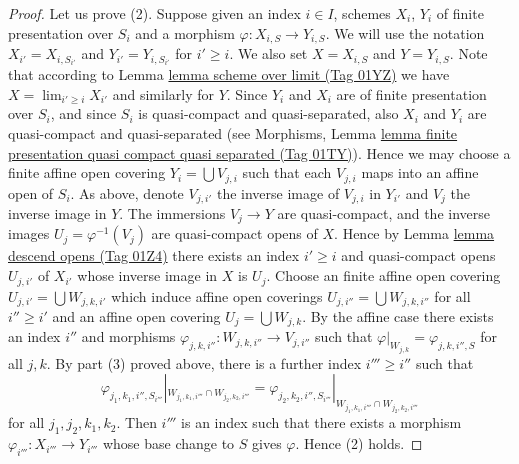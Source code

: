 \documentclass{amsart}
\theoremstyle{plain}
\theoremstyle{definition}
\theoremstyle{remark}
\numberwithin{equation}{subsection}
\def\lim{\mathop{\mathrm{lim}}\nolimits}
\begin{document}
\begin{proof}
\medskip\noindent
Let us prove (2). Suppose given an index $i \in I$, schemes
$X_i$, $Y_i$ of finite presentation over $S_i$ and a morphism
$\varphi : X_{i, S} \to Y_{i, S}$. We will use the notation
$X_{i'} = X_{i, S_{i'}}$ and $Y_{i'} = Y_{i, S_{i'}}$ for
$i' \geq i$. We also set $X = X_{i, S}$ and $Y = Y_{i, S}$.
Note that according to Lemma \href{https://stacks.math.columbia.edu/tag/01YZ}{lemma scheme over limit (Tag 01YZ)} we have
$X = \lim_{i' \geq i} X_{i'}$ and similarly for $Y$.
Since $Y_i$ and $X_i$ are of finite presentation
over $S_i$, and since $S_i$ is quasi-compact and quasi-separated, also
$X_i$ and $Y_i$ are quasi-compact and quasi-separated
(see Morphisms,
Lemma \href{https://stacks.math.columbia.edu/tag/01TY}{lemma finite presentation quasi compact quasi separated (Tag 01TY)}).
Hence we may choose a finite affine open covering
$Y_i = \bigcup V_{j, i}$ such that each $V_{j, i}$ maps into
an affine open of $S_i$. As above, denote $V_{j, i'}$ the inverse
image of $V_{j, i}$ in $Y_{i'}$ and $V_j$ the inverse image in $Y$.
The immersions $V_j \to Y$ are quasi-compact, and the inverse images
$U_j = \varphi^{-1}(V_j)$ are quasi-compact opens of $X$.
Hence by Lemma \href{https://stacks.math.columbia.edu/tag/01Z4}{lemma descend opens (Tag 01Z4)} there exists an index
$i' \geq i$ and quasi-compact opens $U_{j, i'}$ of $X_{i'}$
whose inverse image in $X$ is $U_j$. Choose an finite affine open covering
$U_{j, i'} = \bigcup W_{j, k, i'}$ which induce affine open
coverings $U_{j, i''} = \bigcup W_{j, k, i''}$
for all $i'' \geq i'$ and an affine open covering
$U_j = \bigcup W_{j, k}$. By the affine case there exists
an index $i''$ and morphisms
$\varphi_{j, k, i''} : W_{j, k, i''} \to V_{j, i''}$
such that
$\varphi|_{W_{j, k}} = \varphi_{j, k, i'', S}$ for all $j, k$.
By part (3) proved above, there is a further index $i''' \geq i''$
such that
$$
\varphi_{j_1, k_1, i'', S_{i'''}}|_{W_{j_1, k_1, i'''} \cap W_{j_2, k_2, i'''}}
=
\varphi_{j_2, k_2, i'', S_{i'''}}|_{W_{j_1, k_1, i'''} \cap W_{j_2, k_2, i'''}}
$$
for all $j_1, j_2, k_1, k_2$. Then $i'''$ is an index such that
there exists a morphism $\varphi_{i'''} : X_{i'''} \to Y_{i'''}$
whose base change to $S$ gives $\varphi$. Hence (2) holds.


\end{proof}
\end{document}
